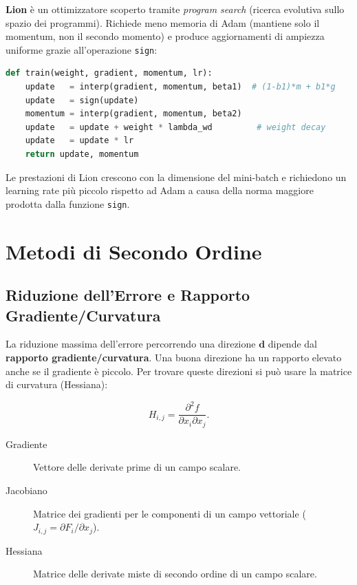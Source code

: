 \textbf{Lion} \citep{chen2023lion} è un ottimizzatore scoperto tramite
\emph{program search} (ricerca evolutiva sullo spazio dei programmi). Richiede
meno memoria di Adam (mantiene solo il momentum, non il secondo momento) e
produce aggiornamenti di ampiezza uniforme grazie all'operazione \texttt{sign}:

\begin{lstlisting}[language=Python, caption={Pseudocodice di Lion.}, label={lst:lion}]
def train(weight, gradient, momentum, lr):
    update   = interp(gradient, momentum, beta1)  # (1-b1)*m + b1*g
    update   = sign(update)
    momentum = interp(gradient, momentum, beta2)
    update   = update + weight * lambda_wd         # weight decay
    update   = update * lr
    return update, momentum
\end{lstlisting}

Le prestazioni di Lion crescono con la dimensione del mini-batch e richiedono un
learning rate più piccolo rispetto ad Adam a causa della norma maggiore prodotta
dalla funzione \texttt{sign}.

\section{Metodi di Secondo Ordine}
\label{sec:second-order}

\subsection{Riduzione dell'Errore e Rapporto Gradiente/Curvatura}
\label{subsec:gradient-curvature}

La riduzione massima dell'errore percorrendo una direzione $\mathbf{d}$ dipende
dal \textbf{rapporto gradiente/curvatura}. Una buona direzione ha un rapporto
elevato anche se il gradiente è piccolo. Per trovare queste direzioni si può
usare la matrice di curvatura (Hessiana):

\begin{equation}
  H_{i,j} = \frac{\partial^2 f}{\partial x_i \partial x_j}.
\end{equation}

\begin{description}
  \item[Gradiente] Vettore delle derivate prime di un campo scalare.
  \item[Jacobiano] Matrice dei gradienti per le componenti di un campo vettoriale
        ($J_{i,j} = \partial F_i / \partial x_j$).
  \item[Hessiana] Matrice delle derivate miste di secondo ordine di un campo
        scalare.
\end{description}

